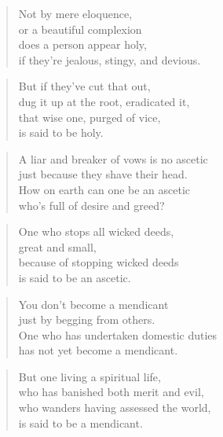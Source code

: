 \documentclass[12pt,openany]{book}%
\begin{document}
\begin{verse}%
Not by mere eloquence, \\
or a beautiful complexion \\
does a person appear holy, \\
if they’re jealous, stingy, and devious. 

%
\end{verse}

\begin{verse}%
But if they’ve cut that out, \\
dug it up at the root, eradicated it, \\
that wise one, purged of vice, \\
is said to be holy. 

%
\end{verse}

\begin{verse}%
A liar and breaker of vows is no ascetic \\
just because they shave their head. \\
How on earth can one be an ascetic \\
who’s full of desire and greed? 

%
\end{verse}

\begin{verse}%
One who stops all wicked deeds, \\
great and small, \\
because of stopping wicked deeds \\
is said to be an ascetic. 

%
\end{verse}

\begin{verse}%
You don’t become a mendicant \\
just by begging from others. \\
One who has undertaken domestic duties \\
has not yet become a mendicant. 

%
\end{verse}

\begin{verse}%
But one living a spiritual life, \\
who has banished both merit and evil, \\
who wanders having assessed the world, \\
is said to be a mendicant. 

%
\end{verse}
\end{document}
